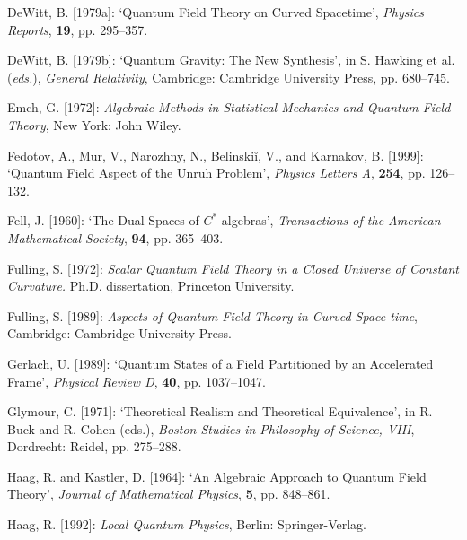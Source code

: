 \documentclass[12pt]{article}
\theoremstyle{remark}
\theoremstyle{definition}
\begin{document}
\noindent DeWitt, B. [1979a]: `Quantum Field Theory on Curved 
Spacetime', \emph{Physics Reports}, \textbf{19}, pp. 
295--357.\vspace{.1in}

\noindent DeWitt, B. [1979b]: `Quantum Gravity: The New Synthesis', in S.
Hawking et al. (\textit{eds.}), \textit{General Relativity}, Cambridge:
Cambridge University Press, pp. 680--745.\vspace{.1in}

  \noindent Emch, G. [1972]: \textit{Algebraic Methods in Statistical Mechanics and
Quantum Field Theory}, New York: John Wiley.\vspace{.1in}

\noindent Fedotov, A., Mur, V., Narozhny, N., Belinski\u{i}, V., and 
Karnakov, B. [1999]: `Quantum Field Aspect of the Unruh Problem', 
\emph{Physics Letters A}, \textbf{254}, pp. 126--132.\vspace{.1in}

\noindent Fell, J. [1960]: `The Dual Spaces of $C^{*}$-algebras', 
\emph{Transactions of the American Mathematical Society}, 
\textbf{94}, pp. 365--403.\vspace{.1in}

\noindent Fulling, S. [1972]: \textit{Scalar Quantum Field Theory 
in a Closed Universe of Constant Curvature.}  Ph.D. dissertation, 
Princeton University.\vspace{.1in}

\noindent Fulling, S. [1989]: \textit{Aspects of Quantum Field Theory in Curved
Space-time}, Cambridge: Cambridge University Press.\vspace{.1in}

\noindent Gerlach, U. [1989]: `Quantum States of a Field Partitioned by an 
Accelerated Frame', \textit{Physical Review D}, \textbf{40}, pp. 
1037--1047.\vspace{.1in}

\noindent Glymour, C. [1971]: `Theoretical Realism and Theoretical Equivalence', in R. 
Buck and R. Cohen (eds.), \textit{Boston Studies in Philosophy of
Science, VIII}, Dordrecht: Reidel, pp. 275--288.\vspace{.1in}

\noindent Haag, R. and Kastler, D. [1964]: `An Algebraic Approach to Quantum Field
Theory', \textit{Journal of Mathematical Physics}, \textbf{5}, pp. 
848--861.\vspace{.1in}

\noindent Haag, R. [1992]: \textit{Local Quantum Physics}, Berlin: 
Springer-Verlag.\vspace{.1in}
\end{document}
